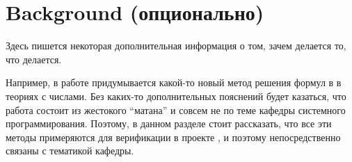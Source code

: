 
\section{Background (опционально)}
Здесь пишется некоторая дополнительная информация о том, зачем делается то, что делается.

Например, в работе придумывается какой-то новый метод решения формул в \SMT{} в теориях с числами. Без каких-то дополнительных пояснений будет казаться, что работа состоит из жестокого ``матана'' и совсем не по теме кафедры системного программирования.
Поэтому, в данном разделе стоит рассказать, что все эти методы примеряются для верификации в проекте \vsharp{}, и поэтому непосредственно связаны с тематикой кафедры.
